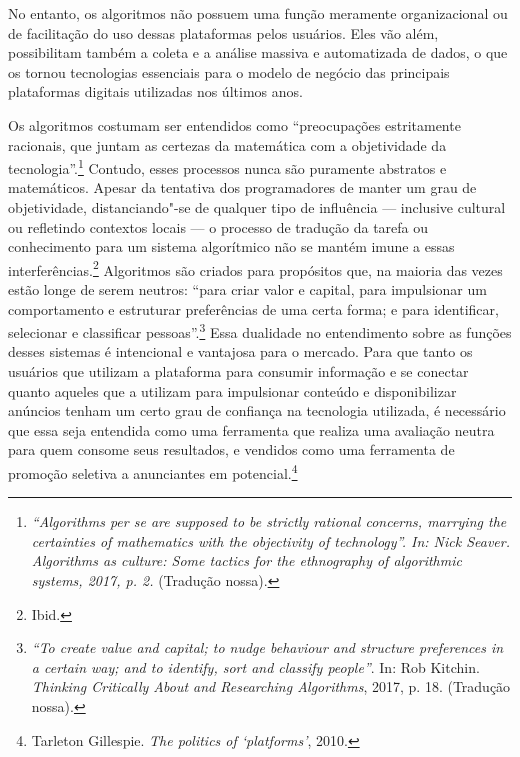 No entanto, os algoritmos não possuem uma função meramente
organizacional ou de facilitação do uso dessas plataformas pelos
usuários. Eles vão além, possibilitam também a coleta e a análise
massiva e automatizada de dados, o que os tornou tecnologias essenciais
para o modelo de negócio das principais plataformas digitais utilizadas
nos últimos anos.

Os algoritmos costumam ser entendidos como ``preocupações estritamente
racionais, que juntam as certezas da matemática com a objetividade da
tecnologia''.\footnote{\emph{``Algorithms per se are supposed to be strictly
  rational concerns, marrying the certainties of mathematics with the
  objectivity of technology''. In: Nick Seaver. \emph{Algorithms as culture: Some tactics for the
ethnography of algorithmic systems}, 2017, p. 2.} (Tradução nossa).}
Contudo, esses processos nunca são puramente abstratos e matemáticos.
Apesar da tentativa dos programadores de manter um grau de objetividade,
distanciando"-se de qualquer tipo de influência --- inclusive cultural ou
refletindo contextos locais --- o processo de tradução da tarefa ou
conhecimento para um sistema algorítmico não se mantém imune a essas
interferências.\footnote{Ibid.} Algoritmos são criados para propósitos que, na
maioria das vezes estão longe de serem neutros: ``para criar valor e
capital, para impulsionar um comportamento e estruturar preferências de
uma certa forma; e para identificar, selecionar e classificar
pessoas''.\footnote{\emph{``To create value and capital; to nudge behaviour and structure preferences in a certain way; and to identify, sort and classify people''}. In: Rob Kitchin. \emph{Thinking Critically About and Researching
Algorithms}, 2017, p. 18. (Tradução nossa).} Essa dualidade no
entendimento sobre as funções desses sistemas é intencional e vantajosa
para o mercado. Para que tanto os usuários que utilizam a plataforma
para consumir informação e se conectar quanto aqueles que a utilizam
para impulsionar conteúdo e disponibilizar anúncios tenham um certo grau
de confiança na tecnologia utilizada, é necessário que essa seja
entendida como uma ferramenta que realiza uma avaliação neutra para quem
consome seus resultados, e vendidos como uma ferramenta de promoção
seletiva a anunciantes em potencial.\footnote{Tarleton Gillespie. \emph{The politics of `platforms'}, 2010.}


